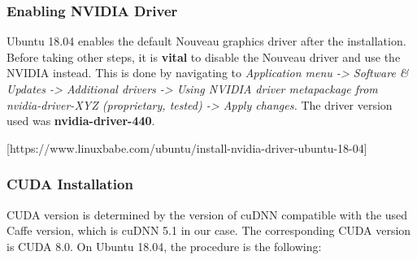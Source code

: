 \subsubsection{Enabling NVIDIA Driver}

Ubuntu 18.04 enables the default Nouveau graphics driver after the installation. Before taking other steps, it is \textbf{vital} to disable the Nouveau driver and use the NVIDIA instead. This is done by navigating to \textit{Application menu -> Software \& Updates -> Additional drivers
	-> Using NVIDIA driver metapackage from nvidia-driver-XYZ (proprietary, tested) -> Apply changes.} The driver version used was \textbf{nvidia-driver-440}.

[https://www.linuxbabe.com/ubuntu/install-nvidia-driver-ubuntu-18-04]

\subsubsection{CUDA Installation}

CUDA version is determined by the version of cuDNN compatible with the used Caffe version, which is cuDNN 5.1 in our case. The corresponding CUDA version is CUDA 8.0. On Ubuntu 18.04, the procedure is the following:

